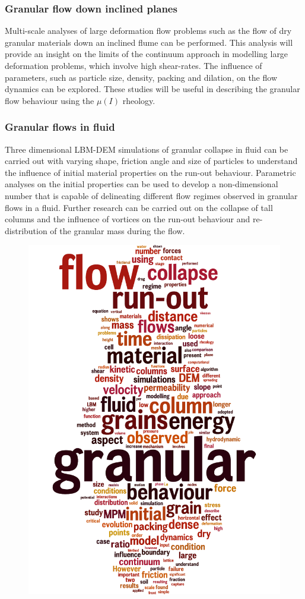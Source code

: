 \subsubsection*{Granular flow down inclined planes}

Multi-scale analyses of large deformation flow problems such as the flow of dry 
granular materials down an inclined flume can be performed. This analysis will 
provide an insight on the limits of the continuum approach in modelling large 
deformation problems, which involve high shear-rates. The influence of 
parameters, such as particle size, density, packing and dilation, on the flow 
dynamics can be explored. These studies will be useful in describing the 
granular flow behaviour using the $\mu(I)$ rheology.

\subsubsection*{Granular flows in fluid}

Three dimensional LBM-DEM simulations of granular collapse in fluid can be 
carried out with varying shape, friction angle and size of particles to 
understand the influence of initial material properties on the run-out 
behaviour. Parametric analyses on the initial properties can be used to develop 
a non-dimensional number that is capable of delineating different flow regimes 
observed in granular flows in a fluid. Further research can be carried out on 
the collapse of tall columns and the influence of vortices on the run-out 
behaviour and re-distribution of the granular mass during the flow.

\newpage
\thispagestyle{empty}
\begin{figure}[tbhp]
\centering
	\includegraphics[height=0.95\textheight]{word_cloud}
\end{figure}